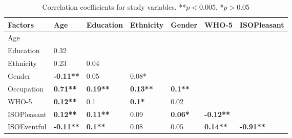 \begin{table}[!h]
  \centering
  \caption{Correlation coefficients for study variables. **$p<0.005$, *$p>0.05$\label{tab:whoCorr}}
  \begin{tabular}{@{}l|llllll@{}}
    \toprule
    Factors     & Age              & Education       & Ethnicity       & Gender         & WHO-5            & ISOPleasant      \\ \midrule
    Age         &                  &                 &                 &                &                  &                  \\
    Education   & 0.32             &                 &                 &                &                  &                  \\
    Ethnicity   & 0.23             & 0.04            &                 &                &                  &                  \\
    Gender      & \textbf{-0.11**} & 0.05            & 0.08*           &                &                  &                  \\
    Occupation  & \textbf{0.71**}  & \textbf{0.19**} & \textbf{0.13**} & \textbf{0.1**} &                  &                  \\
    WHO-5       & \textbf{0.12**}  & 0.1             & \textbf{0.1*}   & 0.02           &                  &                  \\
    ISOPleasant & \textbf{0.12**}  & \textbf{0.11**} & 0.09            & \textbf{0.06*} & \textbf{-0.12**} &                  \\
    ISOEventful & \textbf{-0.11**} & \textbf{0.1**}  & 0.08            & 0.05           & \textbf{0.14**}  & \textbf{-0.91**} \\ \bottomrule
  \end{tabular}
\end{table}

